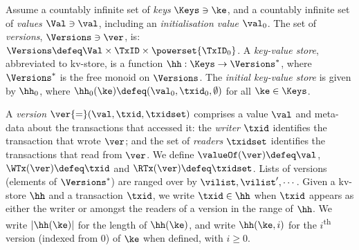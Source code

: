 \begin{definition}
\label{def:his_heap}
\label{def:mkvs}
Assume a countably infinite set of \emph{keys} $\Keys \ni \ke$, 
and a countably infinite set of  \emph{values} $\Val \ni \val$, 
including an \emph{initialisation value} $\val_0 $.
The set of \emph{versions}, $\Versions \ni \ver$, is: $\Versions \defeq \Val \times \TxID \times \powerset{\TxID_{0}}$. 
A \emph{key-value store}, abbreviated to kv-store,  is a function $\hh: \Keys \rightarrow \Versions^{\ast}$, 
where $\Versions^{\ast}$ is the free monoid on $\Versions$. 
The \emph{initial key-value store} is given by $\hh_0$, where 
$\hh_{0}(\ke)\defeq  (\val_0, \txid_0, \emptyset)$ for
all $\ke \in \Keys$.



\end{definition}


A \emph{version} $\ver {=} (\val, \txid, \txidset)$ comprises  a value $\val$
and meta-data about the transactions that accessed it: the \emph{writer} $\txid$ identifies the transaction that wrote $\ver$;
and the set of \emph{readers} $\txidset$ identifies  the  transactions
that read from  $\ver$.
We define $\valueOf(\ver) \defeq \val$,
$\WTx(\ver) \defeq \txid$ and $\RTx(\ver) \defeq \txidset$. 
Lists of versions (elements of $\Versions^{\ast}$) are ranged over by $\vilist, \vilist',\cdots$.
Given a kv-store $\hh$ and a transaction $\txid$, we write 
$\txid \in \hh$ when $\txid$ appears as either the writer or amongst the readers of a version in the range of $\hh$.
We write  $\lvert \hh(\ke) \rvert$ for the length of $\hh(\ke)$, 
and write $\hh(\ke, i)$ for the $i$\textsuperscript{th} version (indexed from 0) of $\ke$ when defined, with $i \geq 0$.




